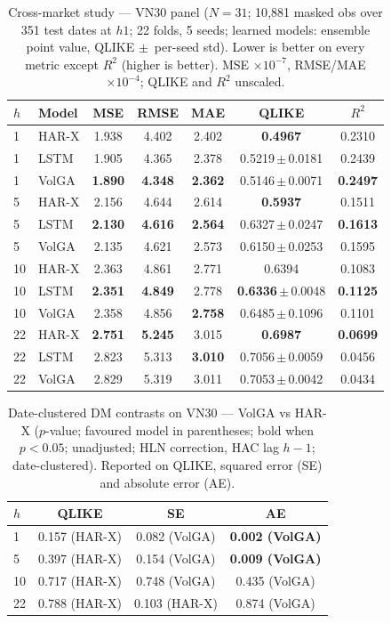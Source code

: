 \documentclass[runningheads]{llncs}
\begin{document}
\begin{table}[t]
\centering
\caption{Cross-market study --- VN30 panel ($N=31$; 10{,}881 masked obs over 351 test dates at $h1$;
22 folds, 5 seeds; learned models: ensemble point value, QLIKE $\pm$~per-seed std). Lower is better on
every metric except $R^2$ (higher is better). MSE $\times10^{-7}$, RMSE/MAE $\times10^{-4}$; QLIKE and
$R^2$ unscaled.}
\label{tab:vn30}
\footnotesize
\setlength{\tabcolsep}{6pt}
\begin{tabular}{llccccc}
\toprule
$h$ & Model & MSE & RMSE & MAE & QLIKE & $R^2$ \\
\midrule
1 & HAR-X & 1.938 & 4.402 & 2.402 & \textbf{0.4967} & 0.2310 \\
1 & LSTM  & 1.905 & 4.365 & 2.378 & 0.5219\,$\pm$\,0.0181 & 0.2439 \\
1 & VolGA & \textbf{1.890} & \textbf{4.348} & \textbf{2.362} & 0.5146\,$\pm$\,0.0071 & \textbf{0.2497} \\
\midrule
5 & HAR-X & 2.156 & 4.644 & 2.614 & \textbf{0.5937} & 0.1511 \\
5 & LSTM  & \textbf{2.130} & \textbf{4.616} & \textbf{2.564} & 0.6327\,$\pm$\,0.0247 & \textbf{0.1613} \\
5 & VolGA & 2.135 & 4.621 & 2.573 & 0.6150\,$\pm$\,0.0253 & 0.1595 \\
\midrule
10 & HAR-X & 2.363 & 4.861 & 2.771 & 0.6394 & 0.1083 \\
10 & LSTM  & \textbf{2.351} & \textbf{4.849} & 2.778 & \textbf{0.6336}\,$\pm$\,0.0048 & \textbf{0.1125} \\
10 & VolGA & 2.358 & 4.856 & \textbf{2.758} & 0.6485\,$\pm$\,0.1096 & 0.1101 \\
\midrule
22 & HAR-X & \textbf{2.751} & \textbf{5.245} & 3.015 & \textbf{0.6987} & \textbf{0.0699} \\
22 & LSTM  & 2.823 & 5.313 & \textbf{3.010} & 0.7056\,$\pm$\,0.0059 & 0.0456 \\
22 & VolGA & 2.829 & 5.319 & 3.011 & 0.7053\,$\pm$\,0.0042 & 0.0434 \\
\bottomrule
\end{tabular}
\end{table}

\begin{table}[t]
\centering
\caption{Date-clustered DM contrasts on VN30 --- VolGA vs HAR-X ($p$-value; favoured model in
parentheses; bold when $p<0.05$; unadjusted; HLN correction, HAC lag $h{-}1$; date-clustered).
Reported on QLIKE, squared error (SE) and absolute error (AE).}
\label{tab:dm-vn30-harx}
\footnotesize
\setlength{\tabcolsep}{8pt}
\begin{tabular}{lccc}
\toprule
$h$ & QLIKE & SE & AE \\
\midrule
1  & 0.157 (HAR-X) & 0.082 (VolGA) & \textbf{0.002 (VolGA)} \\
5  & 0.397 (HAR-X) & 0.154 (VolGA) & \textbf{0.009 (VolGA)} \\
10 & 0.717 (HAR-X) & 0.748 (VolGA) & 0.435 (VolGA) \\
22 & 0.788 (HAR-X) & 0.103 (HAR-X) & 0.874 (VolGA) \\
\bottomrule
\end{tabular}
\end{table}
\end{document}
